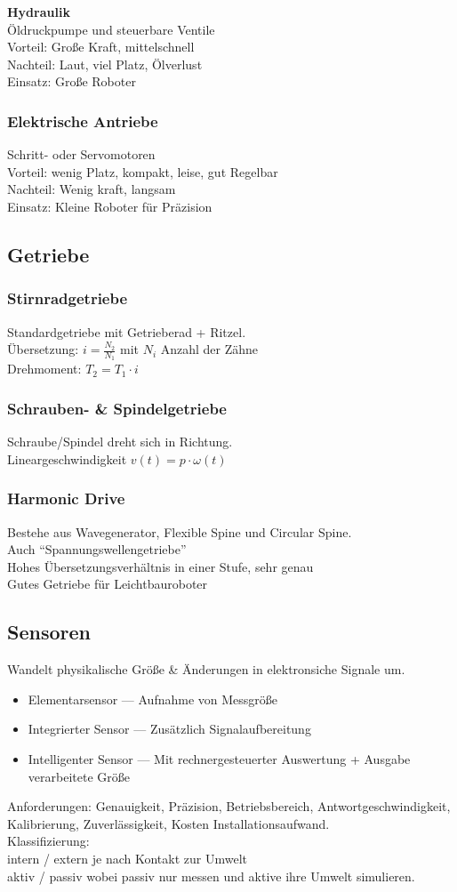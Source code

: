 \textbf{Hydraulik}\\
Öldruckpumpe und steuerbare Ventile\\
Vorteil: Große Kraft, mittelschnell\\
Nachteil: Laut, viel Platz, Ölverlust\\
Einsatz: Große Roboter

\subsubsection{Elektrische Antriebe}
Schritt- oder Servomotoren\\
Vorteil: wenig Platz, kompakt, leise, gut Regelbar\\
Nachteil: Wenig kraft, langsam\\
Einsatz: Kleine Roboter für Präzision

\newpage
\subsection{Getriebe}
\subsubsection{Stirnradgetriebe}
Standardgetriebe mit Getrieberad + Ritzel.\\
Übersetzung: \(i = \frac{N_2}{N_1}\) mit \(N_i\) Anzahl der Zähne\\
Drehmoment: \(T_2 = T_1 \cdot i\)

\subsubsection{Schrauben- \& Spindelgetriebe}
Schraube/Spindel dreht sich in Richtung.\\
Lineargeschwindigkeit \(v(t) = p \cdot \omega(t)\)

\subsubsection{Harmonic Drive}
Bestehe aus Wavegenerator, Flexible Spine und Circular Spine.\\
Auch \enquote{Spannungswellengetriebe}\\
Hohes Übersetzungsverhältnis in einer Stufe, sehr genau\\
Gutes Getriebe für Leichtbauroboter

\subsection{Sensoren}
Wandelt physikalische Größe \& Änderungen in elektronsiche Signale um.
\begin{itemize}
\item Elementarsensor --- Aufnahme von Messgröße
\item Integrierter Sensor --- Zusätzlich Signalaufbereitung
\item Intelligenter Sensor --- Mit rechnergesteuerter Auswertung + Ausgabe verarbeitete Größe
\end{itemize}

Anforderungen: Genauigkeit, Präzision, Betriebsbereich, Antwortgeschwindigkeit, Kalibrierung, Zuverlässigkeit, Kosten
Installationsaufwand.\\

Klassifizierung:\\
intern / extern je nach Kontakt zur Umwelt\\
aktiv / passiv wobei passiv nur messen und aktive ihre Umwelt simulieren.